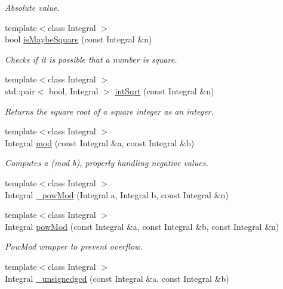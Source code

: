 \begin{DoxyCompactItemize}
\begin{DoxyCompactList}\small\item\em Absolute value. \end{DoxyCompactList}\item 
{\footnotesize template$<$class Integral $>$ }\\bool \hyperlink{namespacecryptomath_a28abfc305f16df25575cba3bb3947bb8}{is\+Maybe\+Square} (const Integral \&n)
\begin{DoxyCompactList}\small\item\em Checks if it is possible that a number is square. \end{DoxyCompactList}\item 
{\footnotesize template$<$class Integral $>$ }\\std\+::pair$<$ bool, Integral $>$ \hyperlink{namespacecryptomath_a0d995827651201bac29716368c7e264b}{int\+Sqrt} (const Integral \&n)
\begin{DoxyCompactList}\small\item\em Returns the square root of a square integer as an integer. \end{DoxyCompactList}\item 
{\footnotesize template$<$class Integral $>$ }\\Integral \hyperlink{namespacecryptomath_ab3f91eb84145b179dc7f377bbec75a95}{mod} (const Integral \&a, const Integral \&b)
\begin{DoxyCompactList}\small\item\em Computes a (mod b), properly handling negative values. \end{DoxyCompactList}\item 
{\footnotesize template$<$class Integral $>$ }\\Integral \hyperlink{namespacecryptomath_a2aed65df4cc031c29146aebffc667c9c}{\+\_\+pow\+Mod} (Integral a, Integral b, const Integral \&n)
\item 
{\footnotesize template$<$class Integral $>$ }\\Integral \hyperlink{namespacecryptomath_a2d0fbf94961a03f0b41a4026bb2d71fe}{pow\+Mod} (const Integral \&a, const Integral \&b, const Integral \&n)
\begin{DoxyCompactList}\small\item\em Pow\+Mod wrapper to prevent overflow. \end{DoxyCompactList}\item 
{\footnotesize template$<$class Integral $>$ }\\Integral \hyperlink{namespacecryptomath_af7628255f4415286878a8c12414fd5a5}{\+\_\+unsignedgcd} (const Integral \&a, const Integral \&b)

\end{DoxyCompactItemize}
